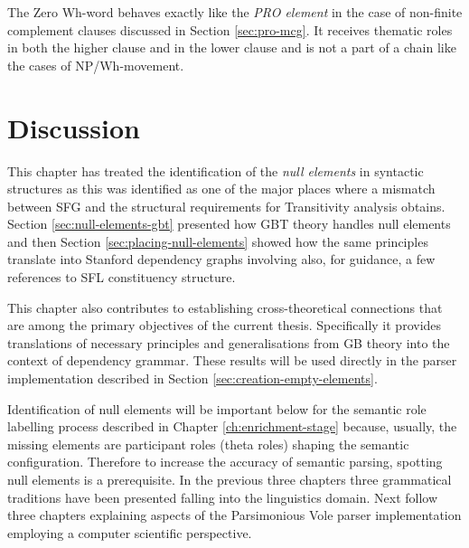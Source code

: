     The Zero Wh-word behaves exactly like the \textit{PRO element} in the case of non-finite complement clauses discussed in Section \ref{sec:pro-mcg}. It receives thematic roles in both the higher clause and in the lower clause and is not a part of a chain like the cases of NP/Wh-movement.

\section{Discussion}
    This chapter has treated the identification of the \textit{null elements} in syntactic structures as this was identified as one of the major places where a mismatch between SFG and the structural requirements for Transitivity analysis obtains. Section \ref{sec:null-elements-gbt} presented how GBT theory handles null elements and then Section \ref{sec:placing-null-elements} showed how the same principles translate into Stanford dependency graphs involving also, for guidance, a few references to SFL constituency structure.

    This chapter also contributes to establishing cross-theoretical connections that are among the primary objectives of the current thesis. Specifically it provides translations of necessary principles and generalisations from GB theory into the context of dependency grammar. These results will be used directly in the parser implementation described in Section \ref{sec:creation-empty-elements}.

    Identification of null elements will be important below for the semantic role labelling process described in Chapter \ref{ch:enrichment-stage} because, usually, the missing elements are participant roles (theta roles) shaping the semantic configuration. Therefore to increase the accuracy of semantic parsing, spotting null elements is a prerequisite.
    In the previous three chapters three grammatical traditions have been presented falling into the linguistics domain. Next follow three chapters explaining aspects of the Parsimonious Vole parser implementation employing a computer scientific perspective. 